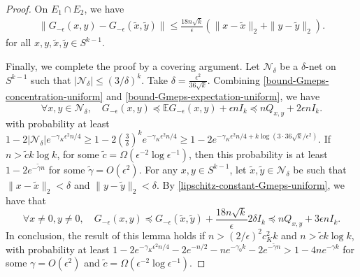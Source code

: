 \documentclass[11pt]{article}
\newcommand{\eps}{\epsilon}
\newcommand{\xtilde}{\tilde{x}}
\newcommand{\spherek}{S^{k-1}}
\newcommand{\calN}{\mathcal{N}}
\newcommand{\Gmeps}{G_{-\eps}}
\newcommand{\matrixleq}{\preceq}
\newcommand{\E}{\mathbb{E}}
\newcommand{\Ndelta}{\calN_\delta}
\newcommand{\ytilde}{\tilde{y}}
\newcommand{\Qxy}{Q_{x,y}}
\begin{document}
\begin{proof}
On $E_1 \cap E_2$, we have  
\begin{align}
\| \Gmeps(x,y) - \Gmeps(\xtilde, \ytilde) \| \leq \frac{18 n \sqrt{k}}{\eps} (\|x-\xtilde\|_2 + \|y-\ytilde\|_2) .   \label{lipschitz-constant-Gmeps-uniform}
\end{align}
for all $x,y,\xtilde, \ytilde \in \spherek$. 

Finally, we complete the proof by a covering argument.  Let $\Ndelta$ be a $\delta$-net on $\spherek$ such that $| \Ndelta| \leq (3/\delta)^k$.  Take $\delta = \frac{\eps^2}{36 \sqrt{k}}$.   Combining \eqref{bound-Gmeps-concentration-uniform} and \eqref{bound-Gmeps-expectation-uniform}, we have 
\[
\forall x,y \in \Ndelta, \quad \Gmeps(x,y) \matrixleq \E \Gmeps(x,y) + \eps  n I_k \matrixleq n\Qxy + 2 \eps n I_k.
\]
with probability at least $1 - 2 | \Ndelta| e^{-\gamma_K \eps^2 n/4} \geq 1 - 2 (\frac{3}{\delta})^k e^{- \gamma_K \eps^2 n/4 } \geq 1 - 2 e^{-\gamma_K \eps^2 n/4 + k \log (3\cdot 36 \sqrt{k}/\eps^2)}$.  If $n > \tilde{c} k \log k$, for some $\tilde{c} = \Omega (\eps^{-2} \log \eps^{-1})$, then this probability is at least $1 - 2 e^{-\tilde{\gamma} n}$ for some $\tilde{\gamma}=O(\eps^2)$. 
For any $x,y \in \spherek$, let $\xtilde, \ytilde \in \Ndelta$ be such that $\|x-\xtilde\|_2 < \delta$ and $\|y-\ytilde\|_2 < \delta$.  By \eqref{lipschitz-constant-Gmeps-uniform}, we have that 
\[
\forall x\neq0, y\neq 0, \quad \Gmeps(x,y) \matrixleq \Gmeps(\xtilde, \ytilde) + \frac{18 n\sqrt{k}}{\eps} 2 \delta I_k \matrixleq n \Qxy + 3 \eps n I_k.
\]
In conclusion, the result of this lemma holds if $n > (2/\eps)^2 c_K^2 k$ and $n > \tilde{c} k \log k$, with probability at least $1 - 2 e^{-\gamma_K \eps^2 n/4} - 2 e^{-n/2} - n e^{-\gamma_0 k} - 2 e^{-\tilde{\gamma} n} > 1 - 4 n e^{-\gamma k}$ for some $\gamma = O(\eps^2)$ and $\tilde{c} = \Omega (\eps^{-2} \log \eps^{-1})$.
\end{proof}
\end{document}
